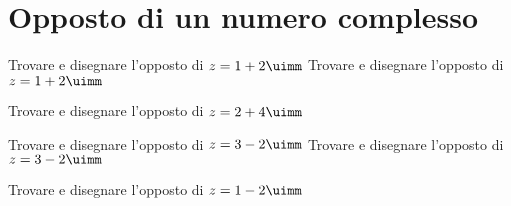  \section{Opposto di un numero complesso}
 \begin{exercise}
Trovare e disegnare l'opposto di $z=1+2\uimm$
\tcblower
Trovare e disegnare l'opposto di $z=1+2\uimm$
\begin{center}

\label{fig:disegnopianocomplesso03}
\end{center}
 \end{exercise}
 \begin{exercise}[no solution]
 Trovare e disegnare l'opposto di $z=2+4\uimm$
 \end{exercise}
  \begin{exercise}
  Trovare e disegnare l'opposto di $z=3-2\uimm$
  	\tcblower
  	 Trovare e disegnare l'opposto di $z=3-2\uimm$
  	\begin{center}
  		
  		\label{fig:disegnopianocomplesso04}
  	\end{center}
  \end{exercise}
 \begin{exercise}[no solution]
 	Trovare e disegnare l'opposto di $z=1-2\uimm$
 \end{exercise}
 